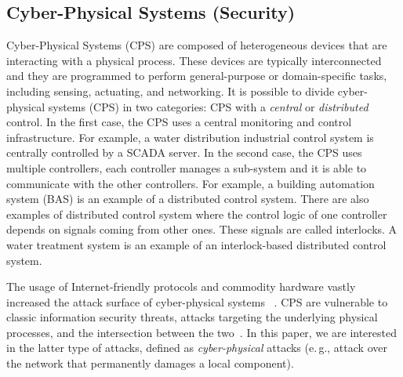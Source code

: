 \documentclass[sigconf]{acmart}
\makeatletter
\newcommand{\eg}{e.\@\,g.,\@\xspace}
\makeatother
\begin{document}


\subsection{Cyber-Physical Systems (Security)}
\label{sec:cps}

Cyber-Physical Systems (CPS) are composed of heterogeneous devices that
are interacting with a physical process. These devices are typically
interconnected and they are programmed to perform general-purpose or
domain-specific tasks, including sensing, actuating, and networking. It is
possible to divide cyber-physical systems (CPS) in two categories: CPS with
a \emph{central} or \emph{distributed} control. In the first case, the CPS
uses a central monitoring and control infrastructure. For example, a water
distribution industrial control system is centrally controlled by a SCADA
server. In the second case, the CPS uses multiple controllers, each controller
manages a sub-system and it is able to communicate with the other controllers.
For example, a building automation system (BAS) is an example of a distributed
control system. There are also examples of distributed control system where
the control logic of one controller depends on signals coming from other ones.
These signals are called interlocks. A water treatment system is an example of
an interlock-based distributed control system.

The usage of Internet-friendly protocols and commodity hardware
vastly increased the attack surface of cyber-physical systems
~\cite{luallen2013sans,leverett2011ics,neumann2007communication,byres2004myths}.
CPS are vulnerable to classic information
security threats, attacks targeting the underlying physical processes, and the
intersection between the two~\cite{humayed2017cyber}. In this paper, we are
interested in the latter type of attacks, defined as \emph{cyber-physical}
attacks (\eg attack over the network that permanently damages a local component).

\end{document}

